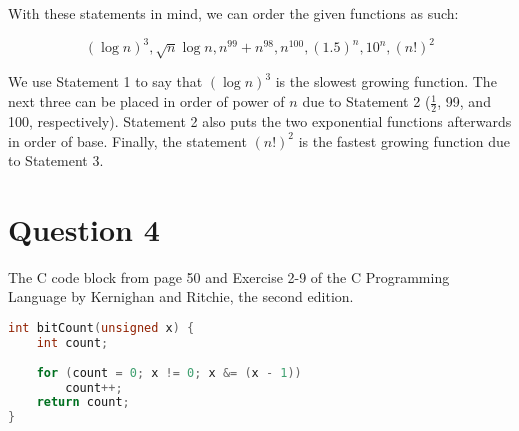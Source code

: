 \documentclass[11pt]{article}
\begin{document}
With these statements in mind, we can order the given functions as such:

\[(\log{n})^3, \sqrt{n}\log{n}, n^{99} + n^{98}, n^{100}, (1.5)^n, 10^n, (n!)^2\]

We use Statement 1 to say that $(\log{n})^3$ is the slowest growing function. The next three can be placed in order of power of $n$ due to Statement 2 ($\frac{1}{2}$, 99, and 100, respectively). Statement 2 also puts the two exponential functions afterwards in order of base. Finally, the statement $(n!)^2$ is the fastest growing function due to Statement 3.

\section*{Question 4}
The C code block from page 50 and Exercise 2-9 of the C Programming Language by Kernighan and Ritchie, the second edition.

\begin{lstlisting}[language=C]
int bitCount(unsigned x) {
    int count;
    
    for (count = 0; x != 0; x &= (x - 1))
        count++;
    return count;
}
\end{lstlisting}

\renewcommand{\labelenumi}{(\alph{enumi})}
\end{document}
